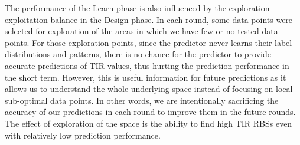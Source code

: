 \documentclass{scrartcl}[2013/05/29]%
\begin{document}
The
performance of the Learn phase
is also influenced by the exploration-exploitation balance in the Design phase.
In each round, some data points were selected for exploration of the areas in which we have few or no tested data points.
For those exploration points, since the predictor never learns their label distributions and patterns, there is no chance for the predictor to provide accurate predictions of TIR values,
thus hurting the prediction performance in the short term.
However, this is useful information for future predictions as it allows us to understand the whole underlying space instead of focusing on local sub-optimal data points.
In other words, we are intentionally sacrificing the accuracy of our predictions in each round to improve them in the future rounds.
The effect of exploration of the space is the ability to find high TIR RBSs even with relatively low prediction performance.\\
\end{document}
